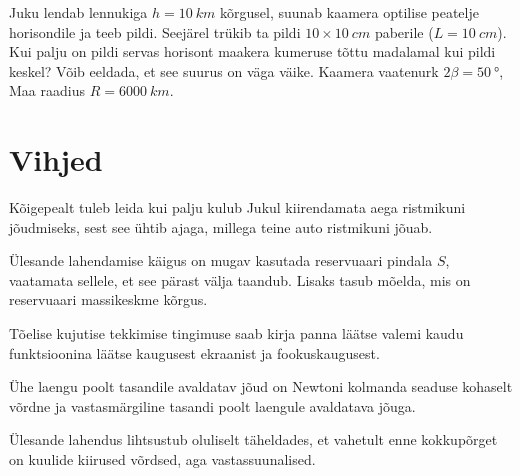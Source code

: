 \documentclass[10pt]{article}
\begin{document}

Juku lendab lennukiga $h=\SI{10}{km}$ kõrgusel, suunab kaamera optilise peatelje horisondile ja teeb pildi. Seejärel trükib ta pildi $10\times \SI{10}{cm}$ paberile ($L=\SI{10}{cm}$). Kui palju on pildi servas horisont maakera kumeruse tõttu madalamal kui pildi keskel? Võib eeldada, et see suurus on väga väike. Kaamera vaatenurk $2\beta=\SI{50}{\degree}$, Maa raadius $R=\SI{6000}{km}$.
\probend
\bigskip
\newpage\normalsize\section{Vihjed}
        \toggleHint
        

\hint
Kõigepealt tuleb leida kui palju kulub Jukul kiirendamata aega ristmikuni jõudmiseks, sest see ühtib ajaga, millega teine auto ristmikuni jõuab.
\probend
\bigskip


\hint
Ülesande lahendamise käigus on mugav kasutada reservuaari pindala $S$, vaatamata sellele, et see pärast välja taandub. Lisaks tasub mõelda, mis on reservuaari massikeskme kõrgus.
\probend
\bigskip


\hint
Tõelise kujutise tekkimise tingimuse saab kirja panna läätse valemi kaudu funktsioonina läätse kaugusest ekraanist ja fookuskaugusest.
\probend
\bigskip


\hint
Ühe laengu poolt tasandile avaldatav jõud on Newtoni kolmanda seaduse kohaselt võrdne ja vastasmärgiline tasandi poolt laengule avaldatava jõuga.
\probend
\bigskip


\hint
Ülesande lahendus lihtsustub oluliselt täheldades, et vahetult enne kokkupõrget on kuulide kiirused võrdsed, aga vastassuunalised.
\probend
\bigskip
\end{document}
